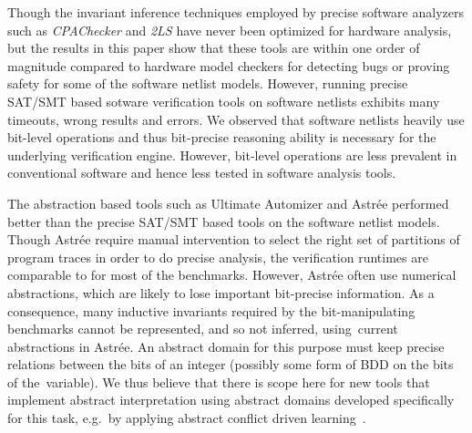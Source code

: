 %
Though the invariant inference techniques employed by precise software 
analyzers such as \emph{CPAChecker} and \emph{2LS} have never
been optimized for hardware analysis, but the results in this paper
show that these tools are within one order of magnitude compared to
hardware model checkers for detecting bugs or proving safety for some
of the software netlist models.  However, running precise SAT/SMT 
based sotware verification tools on software netlists exhibits many 
timeouts, wrong results and errors.  We observed that software netlists 
heavily use bit-level operations and thus bit-precise reasoning ability 
is necessary for the underlying verification engine. However, bit-level operations 
are less prevalent in conventional software and hence less tested in software 
analysis tools.   


%
The abstraction based tools such as Ultimate Automizer and Astr{\'e}e 
performed better than the precise SAT/SMT based tools on the software 
netlist models.  Though Astr{\'e}e require manual intervention 
to select the right set of partitions of program traces in order to do 
precise analysis, the verification runtimes are comparable to \ABC for 
most of the benchmarks.  However, Astr{\'e}e often use numerical 
abstractions, which are likely to lose important bit-precise information.  
As a consequence, many inductive invariants required by the bit-manipulating 
benchmarks cannot be represented, and so not inferred, using current abstractions 
in Astr{\'e}e.  An abstract domain for this purpose must keep 
precise relations between the bits of an integer (possibly some 
form of BDD on the bits of the variable).  We thus believe that there 
is scope here for new tools that implement abstract interpretation using
abstract domains developed specifically for this task, e.g.~by
applying abstract conflict driven learning~\cite{dhk2013-popl}.


